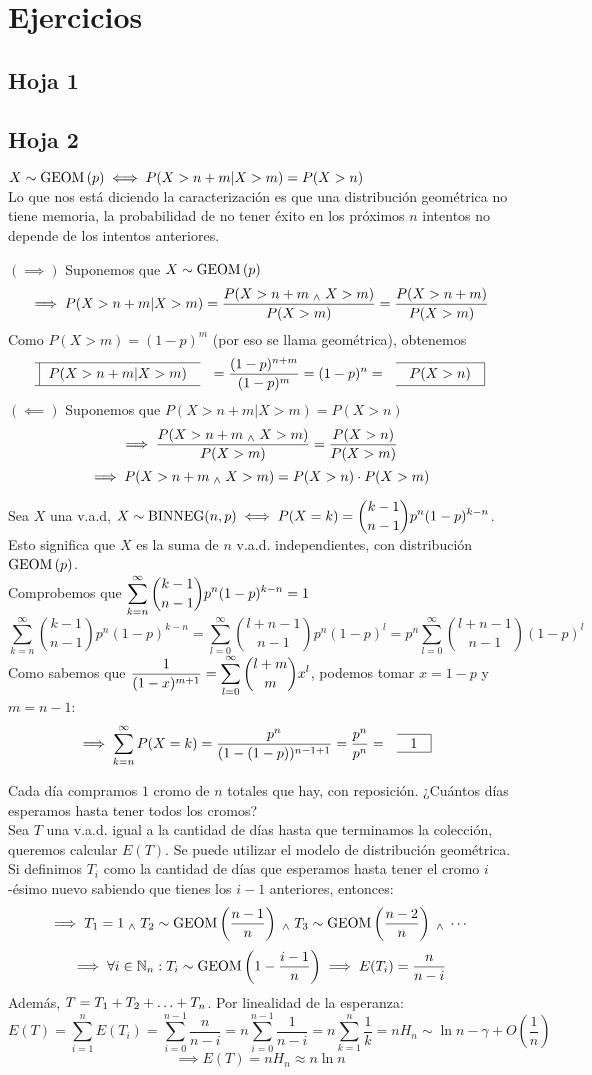 \section{Ejercicios}
\subsection{Hoja 1}
\subsection{Hoja 2}

 $\displaystyle X\sim\operatorname{GEOM}\left(p\right) \iff P(X>n+m|X>m) = P(X>n)$ \\
 Lo que nos está diciendo la caracterización es que una distribución geométrica no tiene memoria, la probabilidad de no tener éxito en los próximos $n$ intentos no depende de los intentos anteriores.
\begin{dem}
	$(\implies)$ Suponemos que $X\sim\operatorname{GEOM}\left(p\right)$
	\[\implies P(X>n+m|X>m)=\frac{P(X>n+m \; _{\wedge} \; X>m)}{P(X>m)}=\frac{P(X>n+m)}{P(X>m)}\]
	Como $P(X>m)=(1-p)^m$ (por eso se llama geométrica), obtenemos
	\[\lbox{P(X>n+m|X>m)}=\frac{(1-p)^{n+m}}{(1-p)^m}=(1-p)^n=\rbox{P(X>n)}\]
	$(\impliedby)$ Suponemos que $P(X>n+m|X>m) = P(X>n)$
	\[\implies \frac{P(X>n+m \; _{\wedge} \; X>m)}{P(X>m)} = \frac{P(X>n)}{P(X>m)} \]
	\[\implies P(X>n+m \; _{\wedge} \; X>m) = P(X>n)\cdot P(X>m)\]
\end{dem}

 Sea $X$ una v.a.d, $\displaystyle X\sim\operatorname{BINNEG}(n,p) \iff P(X=k)=\binom{k-1}{n-1}p^n(1-p)^{k-n}$.\\
Esto significa que $X$ es la suma de $n$ v.a.d. independientes, con distribución $\operatorname{GEOM}\left(p\right)$.\\
Comprobemos que $\displaystyle \sum_{k=n}^{\infty}\binom{k-1}{n-1}p^n(1-p)^{k-n} = 1$
\[\sum_{k=n}^{\infty}\binom{k-1}{n-1}p^n(1-p)^{k-n} = \sum_{l=0}^{\infty} \binom{l+n-1}{n-1}p^n(1-p)^l = p^n\sum_{l=0}^{\infty} \binom{l+n-1}{n-1}(1-p)^l\]
Como sabemos que $\displaystyle \frac{1}{(1-x)^{m+1}} = \sum_{l=0}^{\infty} \binom{l+m}{m}x^l$, podemos tomar $x=1-p$ y $m=n-1$:
\[\implies \sum_{k=n}^{\infty} P(X=k) = \frac{p^n}{(1-(1-p))^{n-1+1}} = \frac{p^n}{p^n} = \rbox{1}\]

 Cada día compramos $1$ cromo de $n$ totales que hay, con reposición. ¿Cuántos días esperamos hasta tener todos los cromos?\\
 Sea $T$ una v.a.d. igual a la cantidad de días hasta que terminamos la colección, queremos calcular $E(T)$. Se puede utilizar el modelo de distribución geométrica. \\
Si definimos $T_i$ como la cantidad de días que esperamos hasta tener el cromo $i$-ésimo nuevo sabiendo que tienes los $i-1$ anteriores, entonces:
\[\implies T_1 = 1 \; _{\wedge} \; T_2 \sim\operatorname{GEOM}\left(\frac{n-1}{n}\right) \; _{\wedge} \; T_3 \sim\operatorname{GEOM}\left(\frac{n-2}{n}\right)\; _{\wedge} \; \cdots\]
\[\implies \forall i \in \mathbb{N}_n : T_i\sim\operatorname{GEOM}\left(1-\frac{i-1}{n}\right) \implies E(T_i)=\frac{n}{n-i}\]
Además, $\displaystyle T = T_1 + T_2 + \ldots + T_n$. Por linealidad de la esperanza:
\[E(T) = \sum_{i=1}^{n} E(T_i) = \sum_{i=0}^{n-1} \frac{n}{n-i} = n\sum_{i=0}^{n-1} \frac{1}{n-i} = n\sum_{k=1}^{n} \frac{1}{k} = nH_{n} \sim \ln{n}-\gamma + O\left(\frac{1}{n}\right)\]
\[\implies E(T)=nH_n \approx n\ln{n}\]

